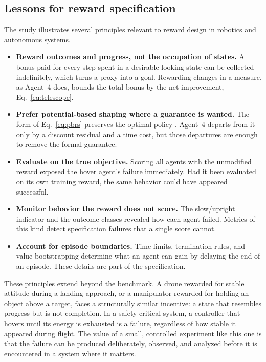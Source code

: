 \documentclass[11pt,a4paper]{article}
\begin{document}
\subsection{Lessons for reward specification}

The study illustrates several principles relevant to reward design in robotics and autonomous systems.
\begin{itemize}
  \item \textbf{Reward outcomes and progress, not the occupation of states.} A bonus paid for every step spent in a desirable-looking state can be collected indefinitely, which turns a proxy into a goal. Rewarding changes in a measure, as Agent~4 does, bounds the total bonus by the net improvement, Eq.~\eqref{eq:telescope}.
  \item \textbf{Prefer potential-based shaping where a guarantee is wanted.} The form of Eq.~\eqref{eq:pbrs} preserves the optimal policy \cite{ng1999}. Agent~4 departs from it only by a discount residual and a time cost, but those departures are enough to remove the formal guarantee.
  \item \textbf{Evaluate on the true objective.} Scoring all agents with the unmodified reward exposed the hover agent's failure immediately. Had it been evaluated on its own training reward, the same behavior could have appeared successful.
  \item \textbf{Monitor behavior the reward does not score.} The slow/upright indicator and the outcome classes revealed how each agent failed. Metrics of this kind detect specification failures that a single score cannot.
  \item \textbf{Account for episode boundaries.} Time limits, termination rules, and value bootstrapping determine what an agent can gain by delaying the end of an episode. These details are part of the specification.
\end{itemize}

These principles extend beyond the benchmark. A drone rewarded for stable attitude during a landing approach, or a manipulator rewarded for holding an object above a target, faces a structurally similar incentive: a state that resembles progress but is not completion. In a safety-critical system, a controller that hovers until its energy is exhausted is a failure, regardless of how stable it appeared during flight. The value of a small, controlled experiment like this one is that the failure can be produced deliberately, observed, and analyzed before it is encountered in a system where it matters.
\end{document}
